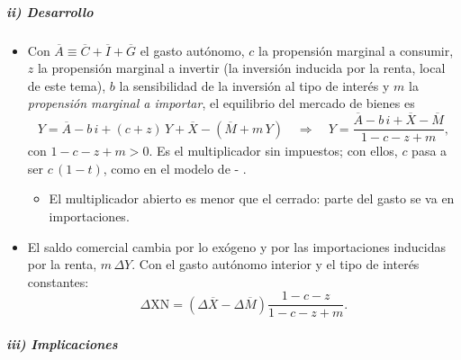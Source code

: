 \documentclass[11pt]{article}
\begin{document}
\subparagraph{ii) Desarrollo}

\begin{itemize}
\item Con $\overline A\equiv\overline C+\overline I+\overline G$ el gasto autónomo, $c$ la propensión marginal a consumir, $z$ la propensión marginal a invertir (la inversión inducida por la renta, local de este tema), $b$ la sensibilidad de la inversión al tipo de interés y $m$ la \emph{propensión marginal a importar}, el equilibrio del mercado de bienes es
  \begin{equation}\label{eq:multiplicador-comercio}
  Y=\overline A-b\,i+(c+z)\,Y+\overline X-\left(\overline M+m\,Y\right)\quad\Longrightarrow\quad Y=\frac{\overline A-b\,i+\overline X-\overline M}{1-c-z+m},
  \end{equation}
  con $1-c-z+m>0$. Es el multiplicador sin impuestos; con ellos, $c$ pasa a ser $c\,(1-t)$, como en el modelo de - .
  \begin{itemize}
  \item El multiplicador abierto es menor que el cerrado: parte del gasto se va en importaciones.
  \end{itemize}
\item El saldo comercial cambia por lo exógeno y por las importaciones inducidas por la renta, $m\,\Delta Y$. Con el gasto autónomo interior y el tipo de interés constantes:
  \begin{equation}\label{eq:multiplicador-xn}
  \Delta\mathrm{XN}=\left(\Delta\overline X-\Delta\overline M\right)\frac{1-c-z}{1-c-z+m}.
  \end{equation}
\end{itemize}

\subparagraph{iii) Implicaciones}
\end{document}
